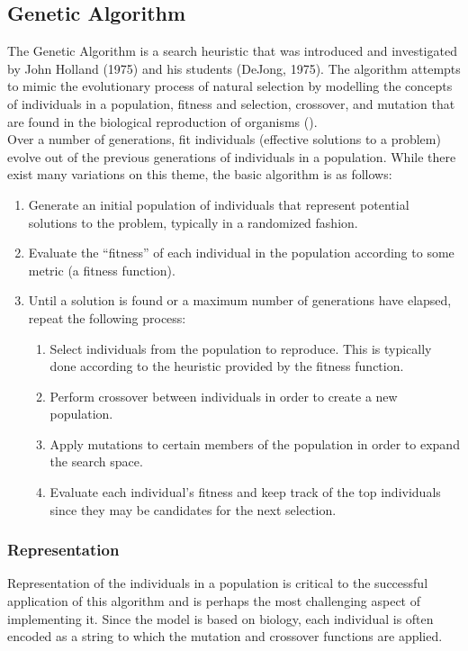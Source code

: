 \newcommand{\tab}{\hspace*{2em}}

\subsection{Genetic Algorithm}
 The Genetic Algorithm is a search heuristic that was introduced and investigated by John Holland (1975) and his students (DeJong, 1975). The algorithm attempts to mimic the evolutionary process of natural selection by modelling the concepts of individuals in a population, fitness and selection, crossover, and mutation that are found in the biological reproduction of organisms (\cite{Mitchell1996}). \\

Over a number of generations, fit individuals (effective solutions to a problem) evolve out of the previous generations of individuals in a population. While there exist many variations on this theme, the basic algorithm is as follows:
\begin{enumerate}
 \item Generate an initial population of individuals that represent potential solutions to the problem, typically in a randomized fashion.
 \item Evaluate the ``fitness'' of each individual in the population according to some metric (a fitness function).
 \item Until a solution is found or a maximum number of generations have elapsed, repeat the following process:
  \begin{enumerate}
   \item Select individuals from the population to reproduce. This is typically done according to the heuristic provided by the fitness function.
   \item Perform crossover between individuals in order to create a new population.
   \item Apply mutations to certain members of the population in order to expand the search space.
   \item Evaluate each individual's fitness and keep track of the top individuals since they may be candidates for the next selection.
  \end{enumerate}
\end{enumerate}


\subsubsection{Representation}
Representation of the individuals in a population is critical to the successful application of this algorithm and is perhaps the most challenging aspect of implementing it. Since the model is based on biology, each individual is often 
encoded as a string to which the mutation and crossover functions are applied. \\

